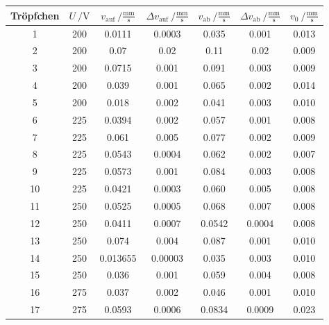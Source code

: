\begin{table}
	\centering
	\begin{tabular}{S[table-format=2.0] S[table-format=3.0] S[table-format=1.6] S[table-format=1.6] S[table-format=1.4] S[table-format=1.4]S[table-format=1.3]}
		\toprule
		{Tröpfchen}& {$U\:/\si{\volt}$} & {$v_\mathup{auf}\:/\frac{\si{\milli\meter}}{\si\second}$} &{$\Delta{v}_\mathup{auf}\:/\frac{\si{\milli\meter}}{\si\second}$} & {$v_\mathup{ab}\:/\frac{\si{\milli\meter}}{\si\second}$} &{$\Delta{v}_\mathup{ab}\:/\frac{\si{\milli\meter}}{\si\second}$}&{$v_0\:/\frac{\si{\milli\meter}}{\si\second}$} \\
		  & 200   &   0.0111    & 0.0003     & 0.035     & 0.001     & 0.013   \\
 2  & 200   &   0.07      & 0.02       & 0.11      & 0.02      & 0.009   \\
 3  & 200   &   0.0715    & 0.001      & 0.091     & 0.003     & 0.009   \\ 
 4  & 200   &   0.039     & 0.001      & 0.065     & 0.002     & 0.014   \\
 5  & 200   &   0.018     & 0.002      & 0.041     & 0.003     & 0.010   \\
 6  & 225   &   0.0394    & 0.002      & 0.057     & 0.001     & 0.008   \\
 7  & 225   &   0.061     & 0.005      & 0.077     & 0.002     & 0.009   \\
 8  & 225   &   0.0543    & 0.0004     & 0.062     & 0.002     & 0.007   \\
 9  & 225   &   0.0573    & 0.001      & 0.084     & 0.003     & 0.008   \\
10  & 225   &   0.0421    & 0.0003     & 0.060     & 0.005     & 0.008   \\
11  & 250   &   0.0525    & 0.0005     & 0.068     & 0.007     & 0.008   \\
12  & 250   &   0.0411    & 0.0007     & 0.0542    & 0.0004    & 0.008   \\
13  & 250   &   0.074     & 0.004      & 0.087     & 0.001     & 0.010   \\
14  & 250   &   0.013655  & 0.00003    & 0.035     & 0.003     & 0.010   \\
15  & 250   &   0.036     & 0.001      & 0.059     & 0.004     & 0.008   \\
16  & 275   &   0.037     & 0.002      & 0.046     & 0.001     & 0.010   \\
17  & 275   &   0.0593    & 0.0006     & 0.0834    & 0.0009    & 0.023   \\

\end{tabular}
\end{table}
